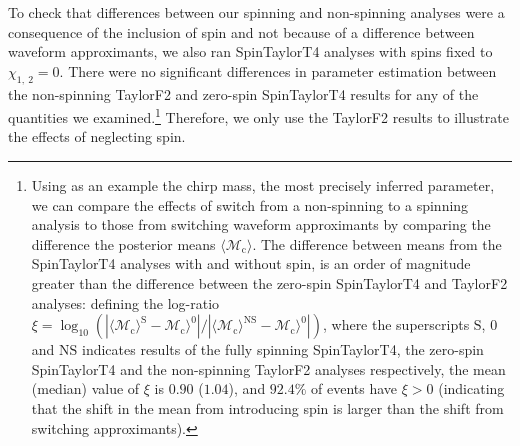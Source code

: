 To check that differences between our spinning and non-spinning analyses were a consequence of the inclusion of spin and not because of a difference between waveform approximants, we also ran SpinTaylorT4 analyses with spins fixed to $\chi_{1,~2}=0$. There were no significant differences in parameter estimation between the non-spinning TaylorF2 and zero-spin SpinTaylorT4 results for any of the quantities we examined.\footnote{Using as an example the chirp mass, the most precisely inferred parameter, we can compare the effects of switch from a non-spinning to a spinning analysis to those from switching waveform approximants by comparing the difference the posterior means $\langle \mathcal{M}_\mathrm{c}\rangle$. The difference between means from the SpinTaylorT4 analyses with and without spin, is an order of magnitude greater than the difference between the zero-spin SpinTaylorT4 and TaylorF2 analyses: defining the log-ratio $\xi = \log_{10}(|\langle \mathcal{M}_\mathrm{c}\rangle^\mathrm{S} - \mathcal{M}_\mathrm{c}\rangle^0|/|\langle \mathcal{M}_\mathrm{c}\rangle^\mathrm{NS} - \mathcal{M}_\mathrm{c}\rangle^0|)$, where the superscripts $\mathrm{S}$, $0$ and $\mathrm{NS}$ indicates results of the fully spinning SpinTaylorT4, the zero-spin SpinTaylorT4 and the non-spinning TaylorF2 analyses respectively, the mean (median) value of $\xi$ is $0.90$ ($1.04$), and $92.4\%$ of events have $\xi > 0$ (indicating that the shift in the mean from introducing spin is larger than the shift from switching approximants).} Therefore, we only use the TaylorF2 results to illustrate the effects of neglecting spin.
  
  
  
  
  
  
  